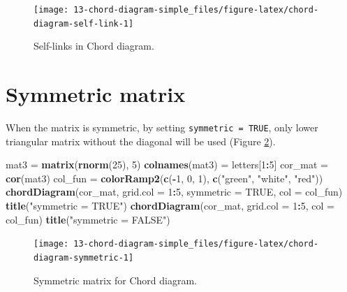 \documentclass[]{book}
\newenvironment{Shaded}{\begin{snugshade}}{\end{snugshade}}
\newcommand{\KeywordTok}[1]{\textcolor[rgb]{0.13,0.29,0.53}{\textbf{#1}}}
\newcommand{\DataTypeTok}[1]{\textcolor[rgb]{0.13,0.29,0.53}{#1}}
\newcommand{\DecValTok}[1]{\textcolor[rgb]{0.00,0.00,0.81}{#1}}
\newcommand{\StringTok}[1]{\textcolor[rgb]{0.31,0.60,0.02}{#1}}
\newcommand{\OtherTok}[1]{\textcolor[rgb]{0.56,0.35,0.01}{#1}}
\newcommand{\OperatorTok}[1]{\textcolor[rgb]{0.81,0.36,0.00}{\textbf{#1}}}
\newcommand{\NormalTok}[1]{#1}
\theoremstyle{definition}
\theoremstyle{definition}
\theoremstyle{remark}
\begin{document}
\begin{figure}

{\centering \texttt{[image: 13-chord-diagram-simple\_files/figure-latex/chord-diagram-self-link-1]} 

}

\caption{Self-links in Chord diagram.}\label{fig:chord-diagram-self-link}
\end{figure}

\section{Symmetric matrix}\label{symmetric-matrix}

When the matrix is symmetric, by setting \texttt{symmetric\ =\ TRUE},
only lower triangular matrix without the diagonal will be used (Figure
\ref{fig:chord-diagram-symmetric}).

\begin{Shaded}
\begin{Highlighting}[]
\NormalTok{mat3 =}\StringTok{ }\KeywordTok{matrix}\NormalTok{(}\KeywordTok{rnorm}\NormalTok{(}\DecValTok{25}\NormalTok{), }\DecValTok{5}\NormalTok{)}
\KeywordTok{colnames}\NormalTok{(mat3) =}\StringTok{ }\NormalTok{letters[}\DecValTok{1}\OperatorTok{:}\DecValTok{5}\NormalTok{]}
\NormalTok{cor_mat =}\StringTok{ }\KeywordTok{cor}\NormalTok{(mat3)}
\NormalTok{col_fun =}\StringTok{ }\KeywordTok{colorRamp2}\NormalTok{(}\KeywordTok{c}\NormalTok{(}\OperatorTok{-}\DecValTok{1}\NormalTok{, }\DecValTok{0}\NormalTok{, }\DecValTok{1}\NormalTok{), }\KeywordTok{c}\NormalTok{(}\StringTok{"green"}\NormalTok{, }\StringTok{"white"}\NormalTok{, }\StringTok{"red"}\NormalTok{))}
\KeywordTok{chordDiagram}\NormalTok{(cor_mat, }\DataTypeTok{grid.col =} \DecValTok{1}\OperatorTok{:}\DecValTok{5}\NormalTok{, }\DataTypeTok{symmetric =} \OtherTok{TRUE}\NormalTok{, }\DataTypeTok{col =}\NormalTok{ col_fun)}
\KeywordTok{title}\NormalTok{(}\StringTok{"symmetric = TRUE"}\NormalTok{)}
\KeywordTok{chordDiagram}\NormalTok{(cor_mat, }\DataTypeTok{grid.col =} \DecValTok{1}\OperatorTok{:}\DecValTok{5}\NormalTok{, }\DataTypeTok{col =}\NormalTok{ col_fun)}
\KeywordTok{title}\NormalTok{(}\StringTok{"symmetric = FALSE"}\NormalTok{)}
\end{Highlighting}
\end{Shaded}

\begin{figure}

{\centering \texttt{[image: 13-chord-diagram-simple\_files/figure-latex/chord-diagram-symmetric-1]} 

}

\caption{Symmetric matrix for Chord diagram.}\label{fig:chord-diagram-symmetric}
\end{figure}
\end{document}
